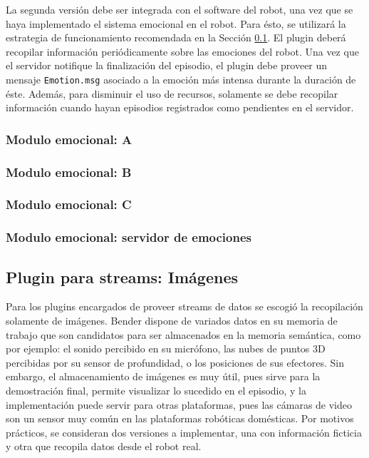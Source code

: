 La segunda versión debe ser integrada con el software del robot, una vez que se haya implementado el sistema emocional en el robot. Para ésto, se utilizará la estrategia de funcionamiento recomendada en la Sección \ref{}. El plugin deberá recopilar información periódicamente sobre las emociones del robot. Una vez que el servidor notifique la finalización del episodio, el plugin debe proveer un mensaje \texttt{Emotion.msg} asociado a la emoción más intensa durante la duración de éste. Además, para disminuir el uso de recursos, solamente se debe recopilar información cuando hayan episodios registrados como pendientes en el servidor.

\subsubsection{Modulo emocional: A}
\subsubsection{Modulo emocional: B}
\subsubsection{Modulo emocional: C}
\subsubsection{Modulo emocional: servidor de emociones}


\subsection{Plugin para streams: Imágenes}

Para los plugins encargados de proveer streams de datos se escogió la recopilación solamente de imágenes. Bender dispone de variados datos en su memoria de trabajo que son candidatos para ser almacenados en la memoria semántica, como por ejemplo: el sonido percibido en su micrófono, las nubes de puntos 3D percibidas por su sensor de profundidad, o los posiciones de sus efectores. Sin embargo, el almacenamiento de imágenes es muy útil, pues sirve para la demostración final, permite visualizar lo sucedido en el episodio, y la implementación puede servir para otras plataformas, pues las cámaras de video son un sensor muy común en las plataformas robóticas domésticas. Por motivos prácticos, se consideran dos versiones a implementar, una con información ficticia y otra que recopila datos desde el robot real.

